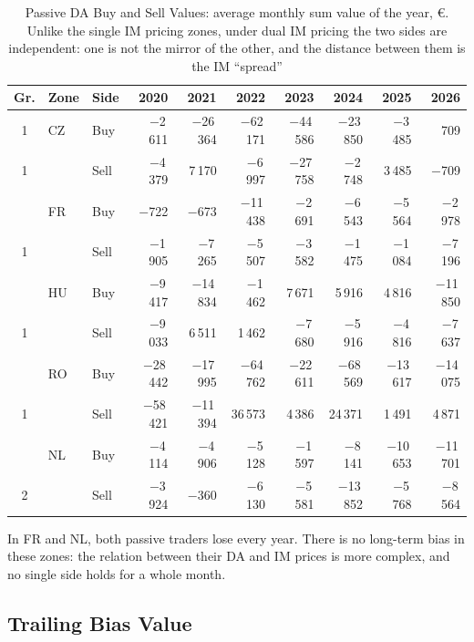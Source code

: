 \documentclass[11pt,a4paper]{article}
\begin{document}
\begin{table}[htbp]
\centering
\small
\setlength{\tabcolsep}{4pt}
\begin{tabular}{@{}c l l rrrrrrr@{}}
\toprule
Gr. & Zone & Side & 2020 & 2021 & 2022 & 2023 & 2024 & 2025 & 2026 \\
\midrule
1 & CZ & Buy  & $-$2\,611 & $-$26\,364 & $-$62\,171 & $-$44\,586 & $-$23\,850 & $-$3\,485 & 709 \\
1 &    & Sell & $-$4\,379 & 7\,170 & $-$6\,997 & $-$27\,758 & $-$2\,748 & 3\,485 & $-$709 \\
\addlinespace
1 & FR & Buy  & $-$722 & $-$673 & $-$11\,438 & $-$2\,691 & $-$6\,543 & $-$5\,564 & $-$2\,978 \\
1 &    & Sell & $-$1\,905 & $-$7\,265 & $-$5\,507 & $-$3\,582 & $-$1\,475 & $-$1\,084 & $-$7\,196 \\
\addlinespace
1 & HU & Buy  & $-$9\,417 & $-$14\,834 & $-$1\,462 & 7\,671 & 5\,916 & 4\,816 & $-$11\,850 \\
1 &    & Sell & $-$9\,033 & 6\,511 & 1\,462 & $-$7\,680 & $-$5\,916 & $-$4\,816 & $-$7\,637 \\
\addlinespace
1 & RO & Buy  & $-$28\,442 & $-$17\,995 & $-$64\,762 & $-$22\,611 & $-$68\,569 & $-$13\,617 & $-$14\,075 \\
1 &    & Sell & $-$58\,421 & $-$11\,394 & 36\,573 & 4\,386 & 24\,371 & 1\,491 & 4\,871 \\
\addlinespace
2 & NL & Buy  & $-$4\,114 & $-$4\,906 & $-$5\,128 & $-$1\,597 & $-$8\,141 & $-$10\,653 & $-$11\,701 \\
2 &    & Sell & $-$3\,924 & $-$360 & $-$6\,130 & $-$5\,581 & $-$13\,852 & $-$5\,768 & $-$8\,564 \\
\bottomrule
\end{tabular}
\caption{Passive DA Buy and Sell Values: average monthly sum value of the year, \euro. Unlike the single IM pricing zones, under dual IM pricing the two sides are independent: one is not the mirror of the other, and the distance between them is the IM ``spread''}
\label{tab:passive_dual}
\end{table}

In FR and NL, both passive traders lose every year. There is no long-term bias in these zones: the relation between their DA and IM prices is more complex, and no single side holds for a whole month.

\subsection{Trailing Bias Value}
\end{document}
